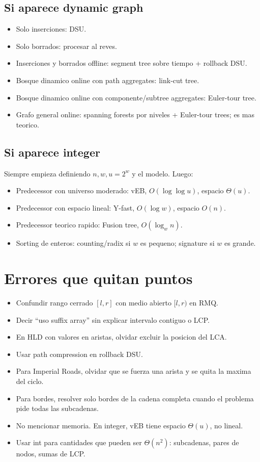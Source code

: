 \documentclass[10pt]{article}
\newcommand{\bigO}{O}
\begin{document}
\subsection{Si aparece dynamic graph}
\begin{itemize}
\item Solo inserciones: DSU.
\item Solo borrados: procesar al reves.
\item Inserciones y borrados offline: segment tree sobre tiempo + rollback DSU.
\item Bosque dinamico online con path aggregates: link-cut tree.
\item Bosque dinamico online con componente/subtree aggregates: Euler-tour tree.
\item Grafo general online: spanning forests por niveles + Euler-tour trees; es mas teorico.
\end{itemize}

\subsection{Si aparece integer}
Siempre empieza definiendo \(n,w,u=2^w\) y el modelo. Luego:
\begin{itemize}
\item Predecessor con universo moderado: vEB, \(\bigO(\log\log u)\), espacio \(\Theta(u)\).
\item Predecessor con espacio lineal: Y-fast, \(\bigO(\log w)\), espacio \(\bigO(n)\).
\item Predecessor teorico rapido: Fusion tree, \(\bigO(\log_w n)\).
\item Sorting de enteros: counting/radix si \(w\) es pequeno; signature si \(w\) es grande.
\end{itemize}

\section{Errores que quitan puntos}
\begin{itemize}
\item Confundir rango cerrado \([l,r]\) con medio abierto \([l,r)\) en RMQ.
\item Decir ``uso suffix array'' sin explicar intervalo contiguo o LCP.
\item En HLD con valores en aristas, olvidar excluir la posicion del LCA.
\item Usar path compression en rollback DSU.
\item Para Imperial Roads, olvidar que se fuerza una arista y se quita la maxima del ciclo.
\item Para bordes, resolver solo bordes de la cadena completa cuando el problema pide todas las subcadenas.
\item No mencionar memoria. En integer, vEB tiene espacio \(\Theta(u)\), no lineal.
\item Usar int para cantidades que pueden ser \(\Theta(n^2)\): subcadenas, pares de nodos, sumas de LCP.
\end{itemize}
\end{document}
